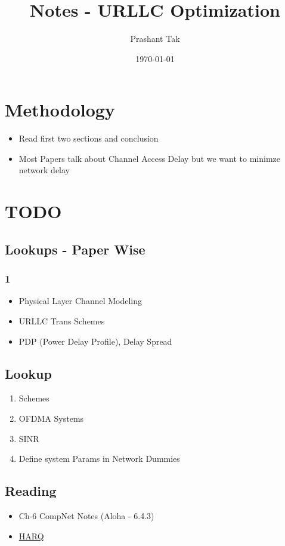\documentclass[11pt]{article}
\author{Prashant Tak}
\date{\today}
\title{Notes - URLLC Optimization}
\begin{document}
\maketitle
\setcounter{tocdepth}{2}
\tableofcontents \clearpage
\section{Methodology}
\label{sec:org43da23d}
\begin{itemize}
\item Read first two sections and conclusion
\item Most Papers talk about Channel Access Delay but we want to minimze network delay
\end{itemize}
\section{TODO}
\label{sec:org36a2814}
\subsection{Lookups - Paper Wise}
\label{sec:org838e6e0}
\subsubsection{1}
\label{sec:org1ccc58c}
\begin{itemize}
\item Physical Layer Channel Modeling
\item URLLC Trans Schemes
\item PDP (Power Delay Profile), Delay Spread
\end{itemize}
\subsection{Lookup}
\label{sec:org60ef959}
\begin{enumerate}
\item Schemes
\item OFDMA Systems
\item SINR
\item Define system Params in Network Dummies
\end{enumerate}
\subsection{Reading}
\label{sec:org0cc1f1d}
\begin{itemize}
\item Ch-6 CompNet Notes (Aloha - 6.4.3)
\item \href{https://www.techplayon.com/hybrid-automatic-repeat-request-harq-in-lte-fdd/}{HARQ}
\end{itemize}
\end{document}
